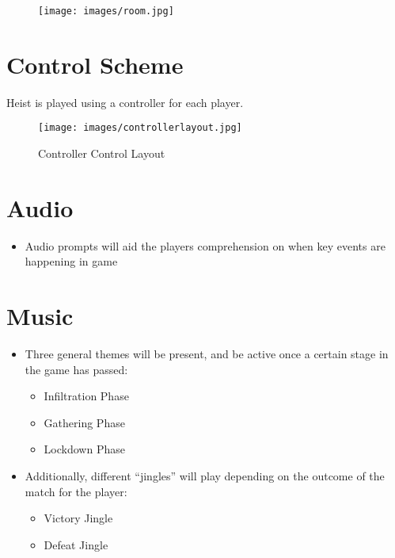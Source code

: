\documentclass[10pt]{report}
\begin{document}
\begin{figure}
    \centering
    \texttt{[image: images/room.jpg]}
    \caption{}
\end{figure}

\section{Control Scheme}

Heist is played using a controller for each player.

\begin{figure}[H]
	\texttt{[image: images/controllerlayout.jpg]} %
    \caption{Controller Control Layout}
\end{figure}

\section{Audio}

\begin{itemize}
    \item Audio prompts will aid the players comprehension on when key events are happening in game
\end{itemize}

\section{Music}

\begin{itemize}
    \item Three general themes will be present, and be active once a certain stage in the game has passed:
    \begin{itemize}
        \item Infiltration Phase
        \item Gathering Phase
        \item Lockdown Phase
    \end{itemize}
    \item Additionally, different “jingles” will play depending on the outcome of the match for the player:
    \begin{itemize}
        \item Victory Jingle
        \item Defeat Jingle
    \end{itemize}
\end{itemize}
\end{document}
